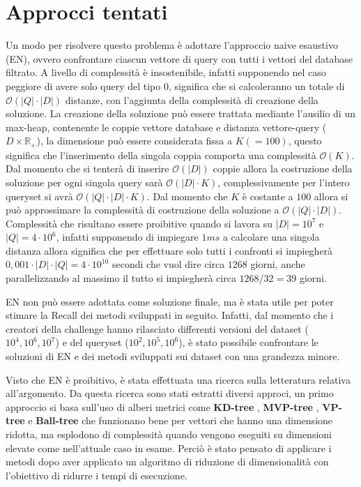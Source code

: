 \section{Approcci tentati}
Un modo per risolvere questo problema è adottare l'approccio naive esaustivo (EN), ovvero 
confrontare ciascun vettore di query con tutti i vettori del database filtrato. 
A livello di complessità è insostenibile, infatti supponendo nel caso peggiore 
di avere solo query del tipo $0$, significa che si calcoleranno un totale di 
$\mathcal{O}(|Q| \cdot |D|)$ distanze, con l'aggiunta della complessità di creazione
della soluzione. La creazione della soluzione può essere trattata mediante l'ausilio 
di un max-heap, contenente le coppie vettore database e distanza vettore-query ($D\times \mathbb{R}_+$),
la dimensione può essere considerata fissa a $K(=100)$, questo significa che l'inserimento 
della singola coppia comporta una complessità $\mathcal{O}(K)$. Dal momento che 
si tenterà di inserire $\mathcal{O}(|D|)$ coppie allora la costruzione della 
soluzione per ogni singola query sarà $\mathcal{O}(|D|\cdot K)$, complessivamente per l'intero 
queryset si avrà $\mathcal{O}(|Q| \cdot |D|\cdot K)$. Dal momento che $K$ è costante 
a $100$ allora si può approssimare la complessità di costruzione della soluzione 
a  $\mathcal{O}(|Q| \cdot |D|)$. Complessità che risultano essere proibitive quando 
si lavora su $|D|= 10^7$ e $|Q|= 4\cdot 10^6$, infatti supponendo di impiegare $1ms$ 
a calcolare una singola distanza allora significa che per effettuare solo tutti i 
confronti si impiegherà $0,001 \cdot |D| \cdot |Q| = 4\cdot 10^{10}$
secondi che vuol dire circa $1268$ giorni, anche parallelizzando al massimo 
il tutto si impiegherà circa $1268/32 = 39$ giorni. 

EN non può essere adottata come soluzione finale, ma è stata utile per poter 
stimare la Recall dei metodi sviluppati in seguito. Infatti, dal momento che i 
creatori della challenge hanno rilasciato differenti versioni del dataset ($10^4, 10^6, 10^7$) e del 
queryset ($10^2, 10^5, 10^6$), è stato possibile confrontare le soluzioni di EN
e dei metodi sviluppati sui dataset con una grandezza minore. 

Visto che EN è proibitivo, è stata effettuata una ricerca sulla letteratura 
relativa all'argomento. Da questa ricerca sono stati estratti diversi approci, 
un primo approccio si basa sull'uso di alberi metrici come \textbf{KD-tree} \cite{kd_tree}, \textbf{MVP-tree}
\cite{mvp_tree1} \cite{mvp_tree2}, \textbf{VP-tree} \cite{vp_tree} e \textbf{Ball-tree} \cite{ball_tree}
che funzionano bene per vettori che hanno una dimensione ridotta, ma esplodono 
di complessità quando vengono eseguiti su dimensioni elevate come nell'attuale 
caso in esame. Perciò è stato pensato di applicare i metodi dopo aver applicato 
un algoritmo di riduzione di dimensionalità con l'obiettivo di ridurre 
i tempi di esecuzione.

